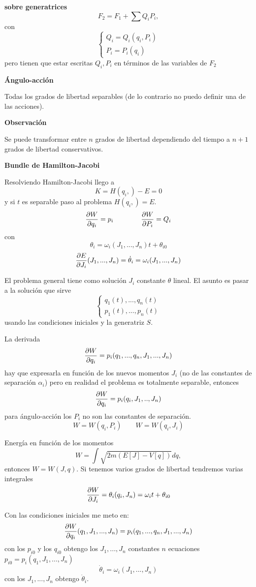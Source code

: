 \documentclass[10pt,oneside]{CBFT_book}
\begin{document}
{\bf sobre generatrices}
\[
	F_2 = F_1 + \sum  Q_i P_i,
\]
con
\[
	\begin{cases}
	Q_i = Q_i( q_i, P_i ) \\
	P_i = P_i( q_i )
	\end{cases}
\]
pero tienen que estar escritas $Q_i, P_i$ en términos de las variables de $F_2$

{\bf Ángulo-acción}

Todas los grados de libertad separables (de lo contrario no puedo definir una de las acciones).

{\bf Observación}

Se puede transformar entre $n$ grados de libertad dependiendo del tiempo a $n+1$ grados de 
libertad conservativos.

{\bf Bundle de Hamilton-Jacobi}

Resolviendo Hamilton-Jacobi llego a
\[
	K = H(q_i,) - E = 0
\]
y si $t$ es separable paso al problema $ H(q_i,) = E $.
\[
	\frac{\partial^{\hspace{-0.05em}} {W}}{\partial {q_i}^{\hspace{-0.05em}}} = p_i \qquad \qquad \frac{\partial^{\hspace{-0.05em}} {W}}{\partial {P_i}^{\hspace{-0.05em}}} = Q_i
\]
con 
\[
	\theta_i = \omega_i(J_1,...,J_n) t + \theta_{i0}
\]
\[
	\frac{\partial^{\hspace{-0.05em}} {E}}{\partial {J_i}^{\hspace{-0.05em}}}(J_1,...,J_n) = \dot{\theta}_i = \omega_i (J_1,...,J_n)
\]

El problema general tiene como solución $J_i$ constante $\theta$ lineal.
El asunto es pasar a la solución que sirve 
\[
	\begin{cases}
	q_1(t), ..., q_n(t) \\
	p_1(t), ..., p_n(t)
	\end{cases}
\]
usando las condiciones iniciales y la generatriz $S$.

La derivada
\[
	\frac{\partial^{\hspace{-0.05em}} {W}}{\partial {q_i}^{\hspace{-0.05em}}} = p_i(q_1,... , q_n,J_1,...,J_n)
\]
hay que expresarla en función de los nuevos momentos $J_i$ (no de las constantes de separación $\alpha_i$) pero
en realidad el problema es totalmente separable, entonces
\[
	\frac{\partial^{\hspace{-0.05em}} {W}}{\partial {q_i}^{\hspace{-0.05em}}} = p_i(q_i,J_1,..,J_n)
\]
para ángulo-acción los $P_i$ no son las constantes de separación.
\[
	W = W(q_i,P_i) \qquad W = W(q_i,J_i)
\]

Energía en función de los momentos
\[
	W = \int \sqrt{ 2 m ( E[J] - V[q] ) } dq, 
\]
entonces $W = W( J, q )$. Si tenemos varios grados de libertad tendremos varias integrales
\[
	\frac{\partial^{\hspace{-0.05em}} {W}}{\partial {J_i}^{\hspace{-0.05em}}} = \theta_i(q_i,J_n) = \omega_i t + \theta_{i0}
\]

Con las condiciones iniciales me meto en:
\[
	\frac{\partial^{\hspace{-0.05em}} {W}}{\partial {q_i}^{\hspace{-0.05em}}}(q_1,J_1,...,J_n) = p_i(q_1,... , q_n,J_1,...,J_n)
\]
con los $p_{i0}$ y los $q_{i0}$ obtengo los $J_1, ..., J_n$ constantes $n$ ecuaciones $p_{i0} = p_i (q_1,J_1,...,J_n)$
\[
	\dot{\theta}_i = \omega_i (J_1, ..., J_n )
\]
con los $J_1, ..., J_n$ obtengo $\dot{\theta}_i$.
\end{document}
